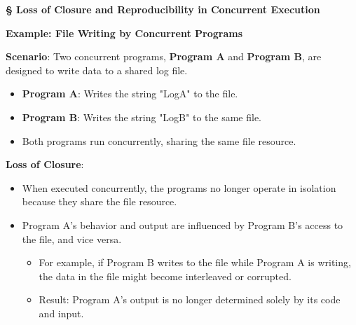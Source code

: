 \documentclass[a4paper]{book}
\newcommand{\sfbf}[1]{{\normalsize\textsf{\textbf{§ #1}}}}
\begin{document}
\hrulefill

\sfbf{Loss of Closure and Reproducibility in Concurrent Execution}

\textbf{Example: File Writing by Concurrent Programs}

\textbf{Scenario}:\newline
Two concurrent programs, \textbf{Program A} and \textbf{Program B}, are designed to write data to a shared log file.
\begin{itemize}
\item 
\textbf{Program A}: Writes the string "LogA" to the file.

\item 
\textbf{Program B}: Writes the string "LogB" to the same file.

\item 
Both programs run concurrently, sharing the same file resource.

\end{itemize}

\hrulefill

\textbf{Loss of Closure}:
\begin{itemize}
\item 
When executed concurrently, the programs no longer operate in isolation because they share the file resource.

\item 
Program A's behavior and output are influenced by Program B's access to the file, and vice versa.
\begin{itemize}
\item 
For example, if Program B writes to the file while Program A is writing, the data in the file might become interleaved or corrupted.

\item 
Result: Program A's output is no longer determined solely by its code and input.

\end{itemize}

\end{itemize}

\hrulefill
\end{document}
